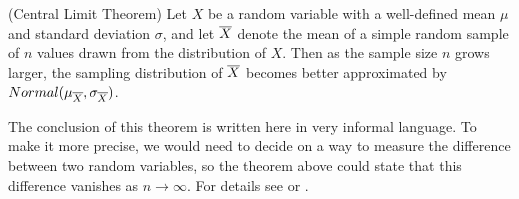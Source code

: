 \par
\begin{thm} (Central Limit Theorem)\label{CLT} Let $X$ be a random variable with a well-defined mean $\mu$ and standard deviation $\sigma$, and let ${\overline{X}}$ denote the mean of a simple random sample of $n$ values drawn from the distribution of $X$. Then as the sample size $n$ grows larger, the sampling distribution of ${\overline{X}}$ becomes better approximated by $Normal(\mu_{\overline{X}},\sigma_{\overline{X}})$.
\end{thm}
\par
The conclusion of this theorem is written here in very informal language. To make it more precise, we would need to decide on a way to measure the difference between two random variables, so the theorem above could state that this difference vanishes as $n \to \infty$. For details see \cite{Bertsekas} or \cite{DevoreBerk}.

